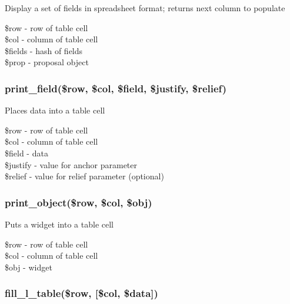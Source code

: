 \documentclass{article}
\begin{document}
Display a set of fields in spreadsheet format; returns next column to 
populate

\begin{description}

\item[{\$row - row of table cell}] \mbox{}
\item[{\$col - column of table cell}] \mbox{}
\item[{\$fields - hash of fields}] \mbox{}
\item[{\$prop - proposal object}] \mbox{}\end{description}
\subsubsection*{print\_field(\$row, \$col, \$field, \$justify, \$relief)\label{BuildTable_print_field_row_col_field_justify_relief_}}


Places data into a table cell

\begin{description}

\item[{\$row - row of table cell}] \mbox{}
\item[{\$col - column of table cell}] \mbox{}
\item[{\$field - data}] \mbox{}
\item[{\$justify - value for anchor parameter}] \mbox{}
\item[{\$relief - value for relief parameter (optional)}] \mbox{}\end{description}
\subsubsection*{print\_object(\$row, \$col, \$obj)\label{BuildTable_print_object_row_col_obj_}}


Puts a widget into a table cell

\begin{description}

\item[{\$row - row of table cell}] \mbox{}
\item[{\$col - column of table cell}] \mbox{}
\item[{\$obj - widget}] \mbox{}\end{description}
\subsubsection*{fill\_l\_table(\$row, [\$col, \$data])\label{BuildTable_fill_l_table_row_col_data_}}
\end{document}
